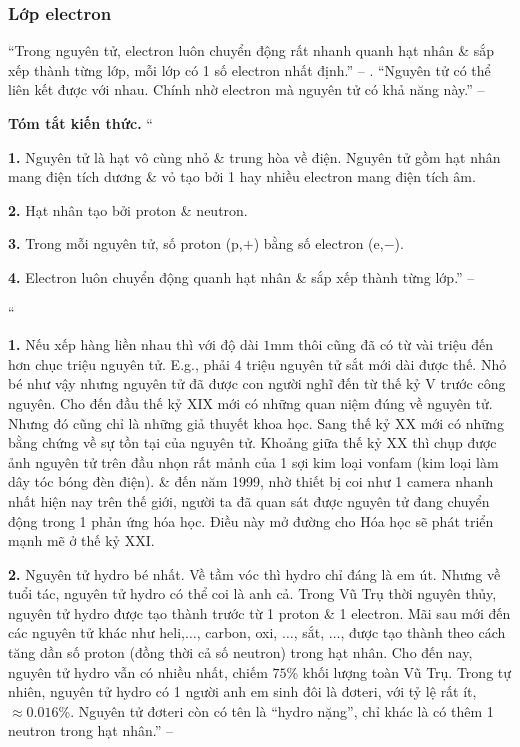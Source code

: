 \documentclass{article}
\numberwithin{equation}{section}
\begin{document}
\subsubsection{Lớp electron}
``Trong nguyên tử, electron luôn chuyển động rất nhanh quanh hạt nhân \& sắp xếp thành từng lớp, mỗi lớp có 1 số electron nhất định.'' -- \cite[p. 14]{SGK_Hoa_Hoc_8}. ``Nguyên tử có thể liên kết được với nhau. Chính nhờ electron mà nguyên tử có khả năng này.'' -- \cite[p. 15]{SGK_Hoa_Hoc_8}
\vspace{2mm}

\noindent\textbf{Tóm tắt kiến thức.}
``\begin{enumerate*}
	\item[\textbf{1.}] Nguyên tử là hạt vô cùng nhỏ \& trung hòa về điện. Nguyên tử gồm hạt nhân mang điện tích dương \& vỏ tạo bởi 1 hay nhiều electron mang điện tích âm.
	\item[\textbf{2.}] Hạt nhân tạo bởi proton \& neutron.
	\item[\textbf{3.}] Trong mỗi nguyên tử, số proton (p,$+$) bằng số electron (e,$-$).
	\item[\textbf{4.}] Electron luôn chuyển động quanh hạt nhân \& sắp xếp thành từng lớp.'' -- \cite[p. 15]{SGK_Hoa_Hoc_8}
\end{enumerate*}

``\begin{enumerate*}
	\item[\textbf{1.}] Nếu xếp hàng liền nhau thì với độ dài $1$mm thôi cũng đã có từ vài triệu đến hơn chục triệu nguyên tử. E.g., phải $4$ triệu nguyên tử sắt mới dài được thế. Nhỏ bé như vậy nhưng nguyên tử đã được con người nghĩ đến từ thế kỷ V trước công nguyên. Cho đến đầu thế kỷ XIX mới có những quan niệm đúng về nguyên tử. Nhưng đó cũng chỉ là những giả thuyết khoa học. Sang thế kỷ XX mới có những bằng chứng về sự tồn tại của nguyên tử. Khoảng giữa thế kỷ XX thì chụp được ảnh nguyên tử trên đầu nhọn rất mảnh của 1 sợi kim loại vonfam (kim loại làm dây tóc bóng đèn điện). \& đến năm 1999, nhờ thiết bị coi như 1 camera nhanh nhất hiện nay trên thế giới, người ta đã quan sát được nguyên tử đang chuyển động trong 1 phản ứng hóa học. Điều này mở đường cho Hóa học sẽ phát triển mạnh mẽ ở thế kỷ XXI.
	\item[\textbf{2.}] Nguyên tử hydro bé nhất. Về tầm vóc thì hydro chỉ đáng là em út. Nhưng về tuổi tác, nguyên tử hydro có thể coi là anh cả. Trong Vũ Trụ thời nguyên thủy, nguyên tử hydro được tạo thành trước từ 1 proton \& 1 electron. Mãi sau mới đến các nguyên tử khác như heli,$\ldots$, carbon, oxi, $\ldots$, sắt, $\ldots$, được tạo thành theo cách tăng dần số proton (đồng thời cả số neutron) trong hạt nhân. Cho đến nay, nguyên tử hydro vẫn có nhiều nhất, chiếm $75$\% khối lượng toàn Vũ Trụ. Trong tự nhiên, nguyên tử hydro có 1 người anh em sinh đôi là đơteri, với tỷ lệ rất ít, $\approx0.016$\%. Nguyên tử đơteri còn có tên là ``hydro nặng'', chỉ khác là có thêm 1 neutron trong hạt nhân.'' -- \cite[p. 16]{SGK_Hoa_Hoc_8}
\end{enumerate*}
\end{document}
